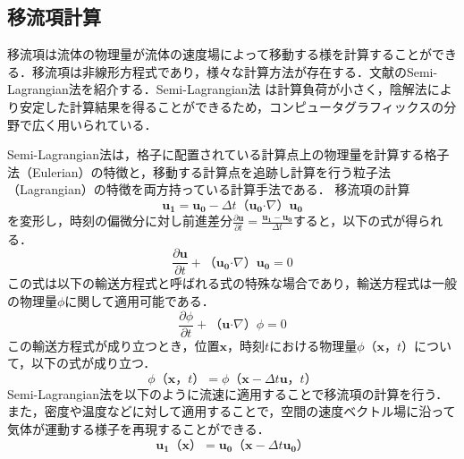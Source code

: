 \documentclass[a4j,12pt]{jreport}
\begin{document}

\subsection{移流項計算}
移流項は流体の物理量が流体の速度場によって移動する様を計算することができる．移流項は非線形方程式であり，様々な計算方法が存在する．文献\cite{fedkiw}のSemi-Lagrangian法を紹介する．Semi-Lagrangian法
は計算負荷が小さく，陰解法により安定した計算結果を得ることができるため，コンピュータグラフィックスの分野で広く用いられている．

Semi-Lagrangian法は，格子に配置されている計算点上の物理量を計算する格子法（Eulerian）の特徴と，移動する計算点を追跡し計算を行う粒子法（Lagrangian）の特徴を両方持っている計算手法である．
移流項の計算$$\bm{u_1} = \bm{u_0}  - \varDelta t （\bm{u_0}  \boldsymbol{\cdot}\nabla） \bm{u_0}$$を変形し，時刻の偏微分に対し前進差分$\frac{\partial \bm{u}}{\partial t} = \frac{\bm{u_1} - \bm{u_0}}{ \varDelta t }$すると，以下の式が得られる．
\[
\frac{\partial \bm{u}}{\partial t}   +（\bm{u_0}  \boldsymbol{\cdot}\nabla） \bm{u_0} = 0
\]
この式は以下の輸送方程式と呼ばれる式の特殊な場合であり，輸送方程式は一般の物理量$\phi$に関して適用可能である．
\begin{equation}\label{eq:transfer}
	\frac{\partial {\phi}}{\partial t}  +（\bm{u}  \boldsymbol{\cdot}\nabla） {\phi} = 0
\end{equation} 
この輸送方程式が成り立つとき，位置$\bm{x}$，時刻$t$における物理量$\phi（\bm{x}，t）$について，以下の式が成り立つ．
\begin{equation}\label{eq:semi-Lagrangian}
	{\phi}（\bm{x}，t） = {\phi}（\bm{x}  - \varDelta t \bm{u}，t）
\end{equation} 
Semi-Lagrangian法を以下のように流速に適用することで移流項の計算を行う．また，密度や温度などに対して適用することで，空間の速度ベクトル場に沿って気体が運動する様子を再現することができる．
\begin{equation}\label{eq:advect}
	\bm{u_1}（\bm{x}） = \bm{u_0}（\bm{x}  - \varDelta t \bm{u_0}）
\end{equation}
\end{document}

